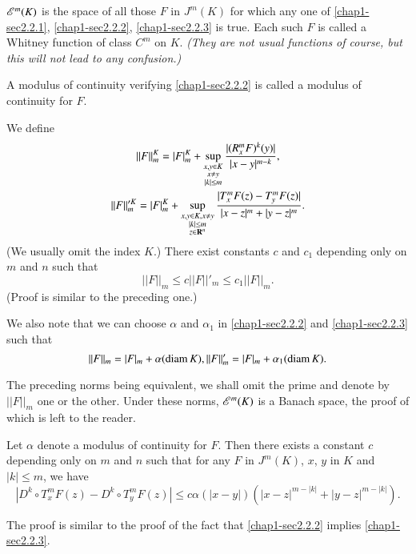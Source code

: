 \begin{definition}\label{chap1-defi2.3}
$\mathscr{E}^{m}(K)$ is the space of all those $F$ in $J^{m}(K)$ for which any one of \eqref{chap1-sec2.2.1}, \eqref{chap1-sec2.2.2}, \eqref{chap1-sec2.2.3} is true. Each such $F$ is called a Whitney function of class $C^{m}$ on $K$. {\em (They are not usual functions of course, but this will not lead to any confusion.)}

A modulus of continuity verifying \eqref{chap1-sec2.2.2} is called a modulus of continuity for $F$.
\end{definition}

We define
\begin{gather*}
||F||^{K}_{m}=|F|^{K}_{m}+\sup\limits_{\substack{x,y\in K\\ x\neq y\\ |k|\leq m}}\dfrac{|(R^{m}_{x}F)^{k}(y)|}{|x-y|^{m-k}},\\
||F||'^{K}_{m}=|F|^{K}_{m}+\sup\limits_{\substack{x,y\in K, x\neq y\\ |k|\leq m\\ z\in \mathbf{R}^{n}}}\dfrac{|T^{m}_{x}F(z)-T^{m}_{y}F(z)|}{|x-z|^{m}+|y-z|^{m}}.
\end{gather*}
(We usually omit the index $K$.) There exist constants $c$ and $c_{1}$ depending only on $m$ and $n$ such that
$$
||F||_{m}\leq c ||F||'_{m}\leq c_{1}||F||_{m}.
$$
(Proof is similar to the preceding one.)

\begin{remark}\label{chap1-rem2.4}
We also note that we can choose $\alpha$ and $\alpha_{1}$ in \eqref{chap1-sec2.2.2} and \eqref{chap1-sec2.2.3} such that
$$
||F||_{m}=|F|_{m}+\alpha(\operatorname{diam} K), ||F||'_{m}=|F|_{m}+\alpha_{1}(\operatorname{diam} K).
$$

The preceding norms being equivalent, we shall omit the prime and denote by $||F||_{m}$ one or the other. Under these norms, $\mathscr{E}^{m}(K)$ is a Banach space, the proof of which is left to the reader.
\end{remark}

\begin{remark}\label{chap1-rem2.5}
Let $\alpha$ denote a modulus of continuity for $F$. Then there exists a constant $c$ depending only on $m$ and $n$ such that for any $F$ in $J^{m}(K)$, $x$, $y$ in $K$ and $|k|\leq m$, we have
$$
|D^{k}\circ T^{m}_{x}F(z)-D^{k}\circ T^{m}_{y}F(z)|\leq c\alpha (|x-y|)(|x-z|^{m-|k|}+|y-z|^{m-|k|}).
$$

The proof is similar to the proof of the fact that \eqref{chap1-sec2.2.2} implies \eqref{chap1-sec2.2.3}.
\end{remark}

